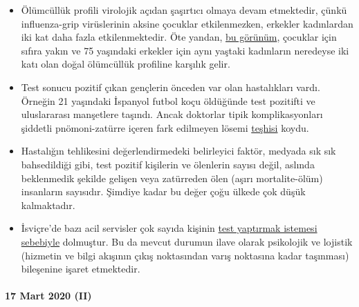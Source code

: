 \begin{itemize}
\tightlist
\item
  Ölümcüllük profili virolojik açıdan şaşırtıcı olmaya devam etmektedir,
  çünkü influenza-grip virüslerinin aksine çocuklar etkilenmezken,
  erkekler kadınlardan iki kat daha fazla etkilenmektedir. Öte yandan,
  \href{https://insideparadeplatz.ch/2020/03/16/notfall-stationen-bereits-seit-tagen-am-anschlag/}{bu
  görünüm}, çocuklar için sıfıra yakın ve 75 yaşındaki erkekler için
  aynı yaştaki kadınların neredeyse iki katı olan doğal ölümcüllük
  profiline karşılık gelir.
\item
  Test sonucu pozitif çıkan gençlerin önceden var olan hastalıkları
  vardı. Örneğin 21 yaşındaki İspanyol futbol koçu öldüğünde test
  pozitifti ve uluslararası manşetlere taşındı. Ancak doktorlar tipik
  komplikasyonları şiddetli pnömoni-zatürre içeren fark edilmeyen lösemi
  \href{https://sports.yahoo.com/spanish-football-coach-francisco-garcia-163153573.html}{teşhisi}
  koydu.
\item
  Hastalığın tehlikesini değerlendirmedeki belirleyici faktör, medyada
  sık sık bahsedildiği gibi, test pozitif kişilerin ve ölenlerin sayısı
  değil, aslında beklenmedik şekilde gelişen veya zatürreden ölen (aşırı
  mortalite-ölüm) insanların sayısıdır. Şimdiye kadar bu değer çoğu
  ülkede çok düşük kalmaktadır.
\item
  İsviçre'de bazı acil servisler çok sayıda kişinin
  \href{https://insideparadeplatz.ch/2020/03/16/notfall-stationen-bereits-seit-tagen-am-anschlag/}{test
  yaptırmak istemesi sebebiyle} dolmuştur. Bu da mevcut durumun ilave
  olarak psikolojik ve lojistik (hizmetin ve bilgi akışının çıkış
  noktasından varış noktasına kadar taşınması) bileşenine işaret
  etmektedir.
\end{itemize}

\hypertarget{17-mart-2020-ii}{%
\paragraph{17 Mart 2020 (II)}\label{17-mart-2020-ii}}


